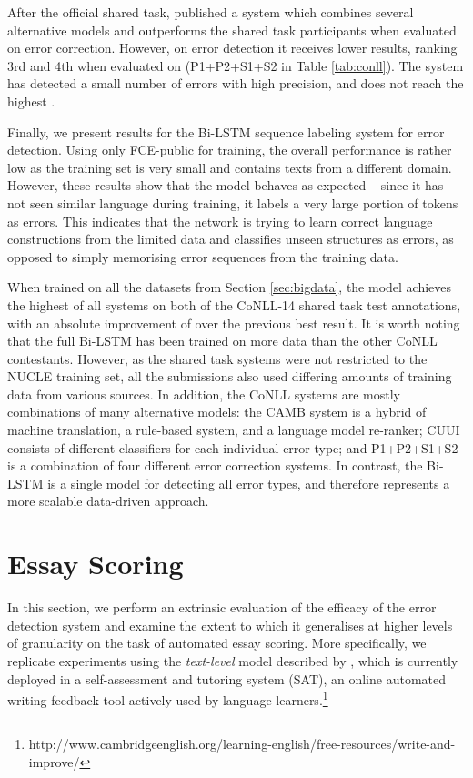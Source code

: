 \documentclass[11pt]{article}
\begin{document}
After the official shared task,  published a system which combines several alternative models and outperforms the shared task participants when evaluated on error correction. However, on error detection it receives lower results, ranking 3rd and 4th when evaluated on   (P1+P2+S1+S2 in Table \ref{tab:conll}). The system has detected a small number of errors with high precision, and does not reach the highest .

Finally, we present results for the Bi-LSTM sequence labeling system for error detection.
Using only FCE-public for training, the overall performance is rather low as the training set is very small and contains texts from a different domain. 
However, these results show that the model behaves as expected -- since it has not seen similar language during training, it labels a very large portion of tokens as errors.
This indicates that the network is trying to learn correct language constructions from the limited data and classifies unseen structures as errors, as opposed to simply memorising error sequences from the training data.


When trained on all the datasets from Section \ref{sec:bigdata}, the model achieves the highest  of all systems on both of the CoNLL-14 shared task test annotations, with an absolute improvement of  over the previous best result. 
It is worth noting that the full Bi-LSTM has been trained on more data than the other CoNLL contestants. However, as the shared task systems were not restricted to the NUCLE training set, all the submissions also used differing amounts of training data from various sources.
In addition, the CoNLL systems are mostly combinations of many alternative models: the CAMB system is a hybrid of machine translation, a rule-based system, and a language model re-ranker; CUUI consists of different classifiers for each individual error type; and P1+P2+S1+S2 is a combination of four different error correction systems.
In contrast, the Bi-LSTM is a single model for detecting all error types, and therefore represents a more scalable data-driven approach.



\section{Essay Scoring}

In this section, we perform an extrinsic evaluation of the efficacy of the error detection system and examine the extent to which it generalises at higher levels of granularity on the task of automated essay scoring. More specifically, we replicate experiments using the \textit{text-level} model described by , which is currently deployed in a self-assessment and tutoring system (SAT), an online automated writing feedback tool actively used by language learners.\footnote{http://www.cambridgeenglish.org/learning-english/free-resources/write-and-improve/}
\end{document}
